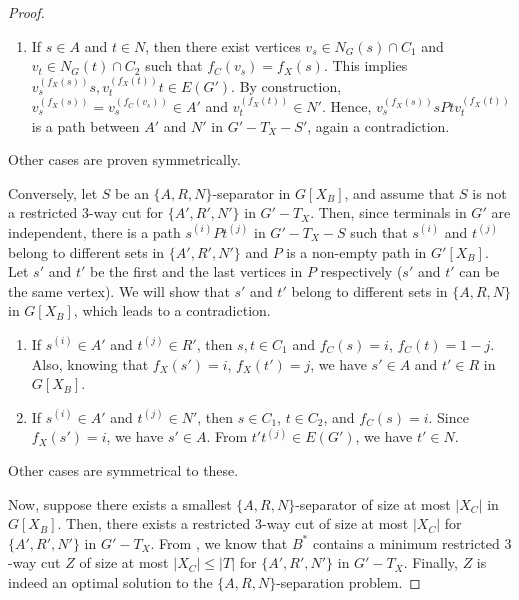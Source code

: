 \begin{proof}
\begin{enumerate}[(1)]
		\item If $s \in A$ and $t \in N$, then
		there exist vertices $v_s \in N_G(s) \cap C_1$ and $v_t \in N_G(t) \cap C_2$
		such that $f_C(v_s)=f_X(s)$.
		This implies $v_s^{(f_X(s))}s, v_t^{(f_X(t))}t \in E(G')$.
		By construction, $v_s^{(f_X(s))}=v_s^{(f_C(v_s))} \in A'$ and $v_t^{(f_X(t))} \in N'$.
		Hence, $v_s^{(f_X(s))} s P t v_t^{(f_X(t))}$ is a path between $A'$ and $N'$ in $G'-T_X-S'$, again a contradiction.
	\end{enumerate}
	Other cases are proven symmetrically.
	
	Conversely, let $S$ be an $\{A,R,N\}$-separator in $G[X_B]$, and
	assume that $S$ is not a restricted $3$-way cut for $\{A',R',N'\}$ in $G' - T_X$.
	Then, since terminals in $G'$ are independent,
	there is a path $s^{(i)} P t^{(j)}$ in $G'-T_X-S$ such that
	$s^{(i)}$ and $t^{(j)}$ belong to different sets in $\{A',R',N'\}$ and $P$ is a non-empty path in $G'[X_B]$.
	Let $s'$ and $t'$ be the first and the last vertices in $P$ respectively ($s'$ and $t'$ can be the same vertex).
	We will show that $s'$ and $t'$ belong to different sets in $\{A,R,N\}$ in $G[X_B]$,
	which leads to a contradiction.
	\begin{enumerate}[(1)]
		\item If $s^{(i)} \in A'$ and $t^{(j)} \in R'$, then $s, t \in C_1$
		and $f_C(s)=i$, $f_C(t)=1-j$.
		Also, knowing that $f_X(s')=i$, $f_X(t')=j$,
		we have $s' \in A$ and $t' \in R$ in $G[X_B]$.
		\item If $s^{(i)} \in A'$ and $t^{(j)} \in N'$, then $s \in C_1$,
		$t \in C_2$, and $f_C(s)=i$.
		Since $f_X(s')=i$, we have $s' \in A$.
		From $t't^{(j)} \in E(G')$, we have $t' \in N$.
	\end{enumerate}
	Other cases are symmetrical to these.
	
	Now, suppose there exists a smallest $\{A,R,N\}$-separator of size at most $|X_C|$ in $G[X_B]$.
	Then, there exists a restricted $3$-way cut of size at most $|X_C|$ for $\{A',R',N'\}$ in $G'-T_X$.
	From ,
	we know that $B^\ast$ contains a minimum restricted $3$-way cut $Z$ of size at most $|X_C| \leq |T|$ for $\{A',R',N'\}$ in $G'-T_X$.
	Finally, $Z$ is indeed an optimal solution to the $\{A,R,N\}$-separation problem.
\end{proof}
